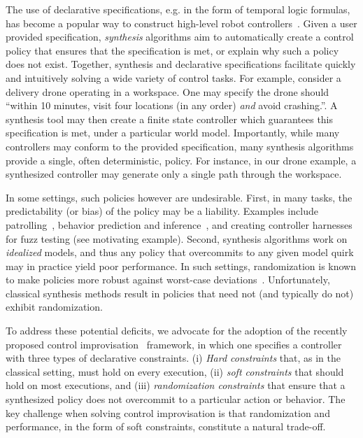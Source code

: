The use of declarative specifications, e.g. in the form of temporal logic formulas, has become a popular way to construct high-level robot controllers~\cite{DBLP:conf/iros/HorowitzWM14, DBLP:conf/rss/WongEK14, DBLP:conf/iros/HeLKV17, DBLP:conf/icra/FuATP16, DBLP:conf/icra/HeWKV19, DBLP:journals/arobots/MoarrefK20, DBLP:conf/icra/KantarosM0P20}.
Given a user provided specification, \emph{synthesis} algorithms aim
to automatically create a control policy that ensures that the
specification is met, or explain why such a policy does not
exist. Together, synthesis and declarative specifications facilitate
quickly and intuitively solving a wide variety of control tasks.  For
example, consider a delivery drone operating in a workspace. One may
specify the drone should ``within 10 minutes, visit four locations (in any
order) \emph{and} avoid crashing.''. A synthesis tool may then create a
finite state controller which guarantees this specification is met,
under a particular world model.
Importantly, while many controllers may conform to the
provided specification, many synthesis algorithms provide a
single, often deterministic, policy.  For instance, in our drone
example, a synthesized controller may generate only a single path
through the workspace.

In some settings, such policies however are undesirable.  First, in
many tasks, the predictability (or bias) of the policy may be a
liability.  Examples include
patrolling~\cite{DBLP:journals/ior/AlpernMP11}, behavior prediction
and inference~\cite{DBLP:conf/cav/Vazquez-Chanlatte20}, and creating
controller harnesses for fuzz testing (see motivating
example). Second, synthesis algorithms work on \emph{idealized}
models, and thus any policy that overcommits to any given model quirk
may in practice yield poor performance. In such settings,
randomization is known to make policies more robust against worst-case
deviations~\cite{mceThesis, maxEntAnswer}. Unfortunately, classical 
synthesis methods result in policies that need not (and typically do
not) exhibit randomization.

To address these potential deficits, we advocate for the adoption of
the recently proposed control
improvisation~\cite{DBLP:conf/cav/FremontS18,DBLP:conf/fsttcs/FremontDSW15}
framework, in which one specifies a controller with three types of
declarative constraints. (i) \emph{Hard constraints} that, as in the
classical setting, must hold on every execution, (ii) \emph{soft constraints} that should hold 
on most executions, and (iii) \emph{randomization
constraints} that ensure that a synthesized policy does not overcommit to a particular action or behavior. 
The key challenge when solving control improvisation is that randomization and performance, in the form of soft constraints, constitute a natural trade-off.

